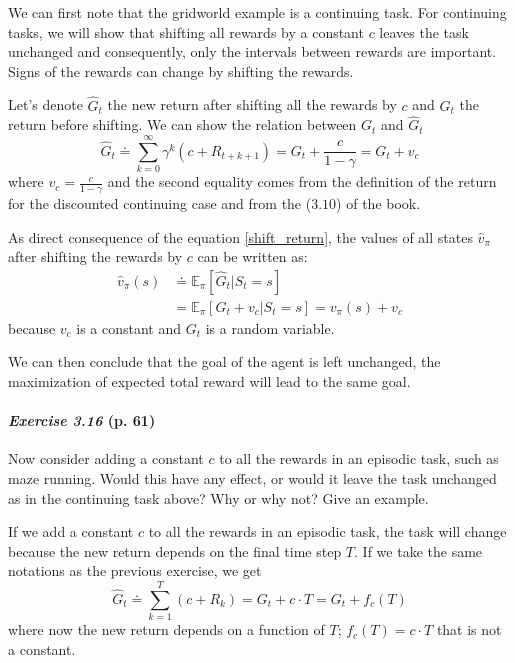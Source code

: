 \documentclass[10pt,a4paper]{article}
\begin{document}
\bigskip
We can first note that the gridworld example is a continuing task. For continuing tasks, we will show that shifting all rewards by a constant $c$ leaves the task unchanged and consequently, only the intervals between rewards are important. Signs of the rewards can change by shifting the rewards.

\bigskip
Let's denote $\hat{G}_t$ the new return after shifting all the rewards by $c$ and $G_t$ the return before shifting. We can show the relation between $G_t$ and $\hat{G}_t$
\begin{equation}\label{shift_return}
\hat{G}_t \doteq \sum_{k=0}^\infty \gamma^k (c + R_{t+k+1}) = G_t + \frac{c}{1-\gamma} = G_t + v_c
\end{equation}
where $v_c = \frac{c}{1-\gamma}$ and the second equality comes from the definition of the return for the discounted continuing case and from the ($3.10$) of the book. 

As direct consequence of the equation \ref{shift_return}, the values of all states $\hat{v}_\pi$ after shifting the rewards by $c$ can be written as:
\begin{equation}
\begin{split}
\hat{v}_\pi(s) &\doteq \mathbb{E}_\pi[\hat{G}_t \lvert S_t = s]\\
&= \mathbb{E}_\pi[ G_t + v_c \lvert S_t = s] = v_\pi(s) + v_c
\end{split}
\end{equation}
because $v_c$ is a constant and $G_t$ is a random variable.

We can then conclude that the goal of the agent is left unchanged, the maximization of expected total reward will lead to the same goal.

\paragraph{\textit{Exercise 3.16} (p. 61)} Now consider adding a constant $c$ to all the rewards in an episodic task, such as maze running. Would this have any effect, or would it leave the task unchanged as in the continuing task above? Why or why not? Give an example.

\bigskip
If we add a constant $c$ to all the rewards in an episodic task, the task will change because the new return depends on the final time step $T$. If we take the same notations as the previous exercise, we get
\begin{equation}
\hat{G}_t \doteq \sum_{k=1}^T (c + R_k) = G_t + c \cdot T = G_t + f_c(T)
\end{equation}
where now the new return depends on a function of $T$; $f_c(T) = c \cdot T$ that is not a constant.
\end{document}
